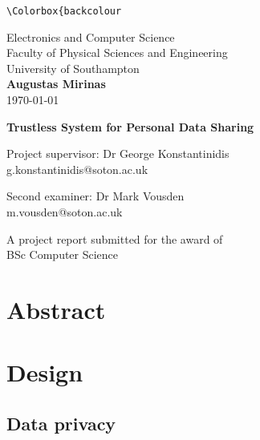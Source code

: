 \documentclass[12pt]{article}
\begin{document}
    \makeatletter
    \xpretocmd\lstinline{\Colorbox{backcolour}\bgroup\appto\lst@DeInit{\egroup}}{}{}
    \makeatother

    \begin{titlepage}
        \begin{center}
            \vspace{1cm}

            \LARGE
            Electronics and Computer Science\\
            Faculty of Physical Sciences and Engineering\\
            University of Southampton\\

            \Large
            \vspace{1.5cm}
            \textbf{Augustas Mirinas}\\
            \today

            \LARGE
            \vspace{1.5cm}
            \textbf{Trustless System for Personal Data Sharing}
            
            \vspace{1.5cm}
            \Large
            Project supervisor: Dr George Konstantinidis\\
            g.konstantinidis@soton.ac.uk
            
            \Large
            Second examiner: Dr Mark Vousden\\
            m.vousden@soton.ac.uk
            
            \vfill
            A project report submitted for the award of\\
            BSc Computer Science
            
        \end{center}
    \end{titlepage}

    \section*{Abstract}
    

    \newpage
    \tableofcontents


    \newpage
    \section{Design}

    \subsection{Data privacy}
    \label{subsec:privacy}
\end{document}
